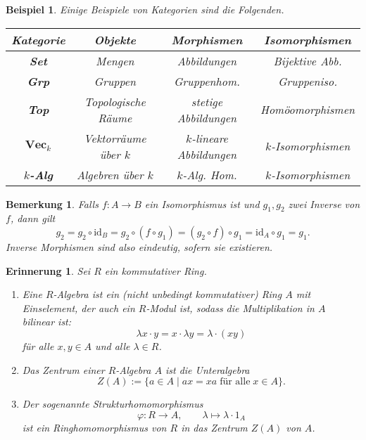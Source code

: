 \documentclass[a4paper, 11pt]{scrartcl}
\newcommand{\id}{\text{id}}
\theoremstyle{basicstyle}
\newtheorem{bemerkung}[definition]{Bemerkung}
\newtheorem{beispiel}[definition]{Beispiel}
\newtheorem{erinnerung}[definition]{Erinnerung}
\begin{document}
    \begin{beispiel}\leavevmode
        Einige Beispiele von Kategorien sind die Folgenden.
        \begin{figure*}[ht!]
            \centering
            \setlength{\tabcolsep}{10pt}
            \renewcommand{\arraystretch}{1.5}
            \begin{tabular}{|c|c|c|c|}
                \hline
                \textbf{Kategorie} & \textbf{Objekte}   & \textbf{Morphismen}   & \textbf{Isomorphismen} \\ \hline
                {\textbf{Set}}          & Mengen                 & Abbildungen               & Bijektive Abb.             \\ \hline
                {\textbf{Grp}}          & Gruppen                & Gruppenhom.               & Gruppeniso.                \\ \hline
                {\textbf{Top}}          & Topologische Räume     & stetige Abbildungen       & Homöomorphismen            \\ \hline
                {\(\textbf{Vec}_{k}\)}  & Vektorräume über \(k\) & \(k\)-lineare Abbildungen & \(k\)-Isomorphismen        \\ \hline
                {\textbf{\(k\)-Alg}}    & Algebren über \(k\)    & \(k\)-Alg. Hom.           & \(k\)-Isomorphismen        \\ \hline
            \end{tabular}
        \end{figure*}
    \end{beispiel}

    \begin{bemerkung}
        Falls \(f: A \to B\) ein Isomorphismus ist und \(g_1, g_2\) zwei Inverse von \(f\), dann gilt
        \[g_2 = g_2 \circ \id_B = g_2 \circ (f \circ g_1) = (g_2 \circ f) \circ g_1 = \id_A \circ g_1 = g_1.\]
        Inverse Morphismen sind also eindeutig, sofern sie existieren.
    \end{bemerkung}

    \begin{erinnerung}
        Sei \(R\) ein kommutativer Ring.
        \begin{enumerate}
            \item Eine \emph{\(R\)-Algebra} ist ein (nicht unbedingt kommutativer) Ring \(A\) mit Einselement, der auch ein \(R\)-Modul ist, sodass die Multiplikation in \(A\) bilinear ist:
                \[\lambda x \cdot y = x \cdot \lambda y = \lambda \cdot (xy)\]
                für alle \(x,y \in A\) und alle \(\lambda \in R\).

            \item Das \emph{Zentrum} einer \(R\)-Algebra \(A\) ist die Unteralgebra
                \[Z(A) := \{a \in A \;\vert\; ax = xa \; \text{für alle} \; x \in A\}.\]

            \item Der sogenannte \emph{Strukturhomomorphismus} 
                \[\varphi: R \longrightarrow A, \qquad \lambda \mapsto \lambda \cdot 1_A\]
                ist ein Ringhomomorphismus von \(R\) in das Zentrum \(Z(A)\) von \(A\).
        \end{enumerate}
    \end{erinnerung}
\end{document}
